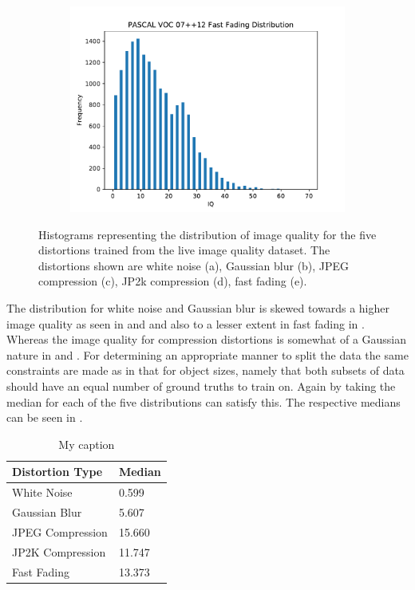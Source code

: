 \begin{figure}[H]
\begin{subfigure}[b]{0.4\textwidth}
        \center
        \includegraphics[width=\textwidth]{Figs/Implementation/FastFadingdist.pdf}
        \caption{}\label{fig:dist_ff}
    \end{subfigure}
    \caption{Histograms representing the distribution of image quality for the five distortions trained from the \gls{live} image quality dataset. The distortions shown are white noise (a), Gaussian blur (b), JPEG compression (c), JP2k compression (d), fast fading (e).}
    \label{fig:iqdist}
\end{figure} 

The distribution for white noise and Gaussian blur is skewed towards a higher image quality as seen in  and  and also to a lesser extent in fast fading in . Whereas the image quality for compression distortions is somewhat of a Gaussian nature in  and . For determining an appropriate manner to split the data the same constraints are made as in that for object sizes, namely that both subsets of data should have an equal number of ground truths to train on. Again by taking the median for each of the five distributions can satisfy this. The respective medians can be seen in .

\begin{table}[h]
\centering
\caption{My caption}
\label{tab:iq_splits}
\begin{tabular}{|l|l|}
\hline
\textbf{Distortion Type}   & \textbf{Median} \\ \hline
White Noise       & 0.599  \\ \hline
Gaussian Blur     & 5.607  \\ \hline
JPEG Compression  & 15.660 \\ \hline
JP2K Compression & 11.747 \\ \hline
Fast Fading       & 13.373 \\ \hline
\end{tabular}
\end{table}

